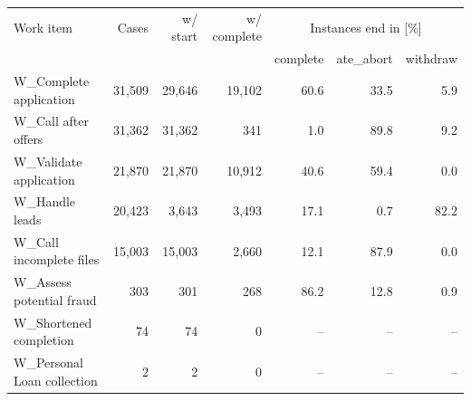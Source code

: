 \begin{tabular}{lrrrrrr}
\toprule
Work item & Cases & w/ start & w/ complete & \multicolumn{3}{c}{Instances end in [\%]} \\
 & & & & complete & ate\_abort & withdraw \\
\midrule
W\_Complete application & 31,509 & 29,646 & 19,102 & 60.6 & 33.5 & 5.9 \\
W\_Call after offers & 31,362 & 31,362 & 341 & 1.0 & 89.8 & 9.2 \\
W\_Validate application & 21,870 & 21,870 & 10,912 & 40.6 & 59.4 & 0.0 \\
W\_Handle leads & 20,423 & 3,643 & 3,493 & 17.1 & 0.7 & 82.2 \\
W\_Call incomplete files & 15,003 & 15,003 & 2,660 & 12.1 & 87.9 & 0.0 \\
W\_Assess potential fraud & 303 & 301 & 268 & 86.2 & 12.8 & 0.9 \\
W\_Shortened completion & 74 & 74 & 0 & -- & -- & -- \\
W\_Personal Loan collection & 2 & 2 & 0 & -- & -- & -- \\
\bottomrule
\end{tabular}
